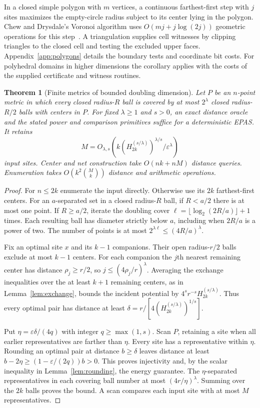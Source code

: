 \documentclass[a4paper,12pt]{article}
\newtheorem{theorem}{Theorem}[section]
\numberwithin{equation}{section}
\begin{document}
In a closed simple polygon with $m$ vertices, a continuous farthest-first step
with $j$ sites maximizes the empty-circle radius subject to its center lying in
the polygon. Chew and Drysdale's Voronoi algorithm uses $O(mj+j\log(2j))$
geometric operations for this step~\cite{chew1986}. A triangulation supplies
cell witnesses by clipping triangles to the closed cell and testing the excluded
upper faces. Appendix~\ref{app:polygons} details the boundary tests and coordinate bit costs. For
polyhedral domains in higher dimensions the corollary applies with the costs of
the supplied certificate and witness routines.

\begin{theorem}[Finite metrics of bounded doubling dimension]\label{thm:doubling}
Let $P$ be an $n$-point metric in which every closed radius-$R$ ball is
covered by at most $2^\lambda$ closed radius-$R/2$ balls with centers in $P$.
For fixed $\lambda\ge1$ and $s>0$, an exact distance oracle and the stated
power and comparison primitives suffice for a deterministic EPAS. It retains
\[
 M=O_{\lambda,s}\!\left(k(H_{2k}^{(s/\lambda)})^{\lambda/s}/
 \varepsilon^\lambda\right)
\]
input sites. Center and net construction take $O(nk+nM)$ distance queries.
Enumeration takes $O(k^2\binom Mk)$ distance and arithmetic operations.
\end{theorem}
\begin{proof}
For $n\le2k$ enumerate the input directly. Otherwise use its $2k$ farthest-first
centers. For an $a$-separated set in a closed radius-$R$ ball, if $R<a/2$
there is at most one point. If $R\ge a/2$, iterate the doubling cover
$\ell=\lfloor\log_2(2R/a)\rfloor+1$ times. Each resulting ball has diameter
strictly below $a$, including when $2R/a$ is a power of two. The number of
points is at most $2^{\lambda\ell}\le(4R/a)^\lambda$.

Fix an optimal site $x$ and its $k-1$ companions. Their open radius-$r/2$ balls
exclude at most $k-1$ centers. For each companion the $j$th nearest remaining
center has distance $\rho_j\ge r/2$, so $j\le(4\rho_j/r)^\lambda$.
Averaging the exchange inequalities over the at least $k+1$ remaining centers,
as in Lemma~\ref{lem:exchange}, bounds the incident potential by
$4^sr^{-s}H_{2k}^{(s/\lambda)}$. Thus every optimal pair has distance at least
$\delta=r/[4(H_{2k}^{(s/\lambda)})^{1/s}]$.

Put $\eta=\varepsilon\delta/(4q)$ with integer $q\ge\max(1,s)$. Scan $P$,
retaining a site when all earlier representatives are farther than $\eta$.
Every site has a representative within $\eta$. Rounding an optimal pair at
distance $b\ge\delta$ leaves distance at least $b-2\eta\ge
(1-\varepsilon/(2q))b>0$. This proves injectivity and, by the scalar inequality
in Lemma~\ref{lem:rounding}, the energy guarantee. The $\eta$-separated
representatives in each covering ball number at most $(4r/\eta)^\lambda$.
Summing over the $2k$ balls proves the bound. A scan compares each input site
with at most $M$ representatives.
\end{proof}
\end{document}
